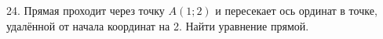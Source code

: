 24. Прямая проходит через точку $A(1;2)$ и пересекает ось ординат в точке, удалённой от начала координат на 2. Найти уравнение прямой.\\

